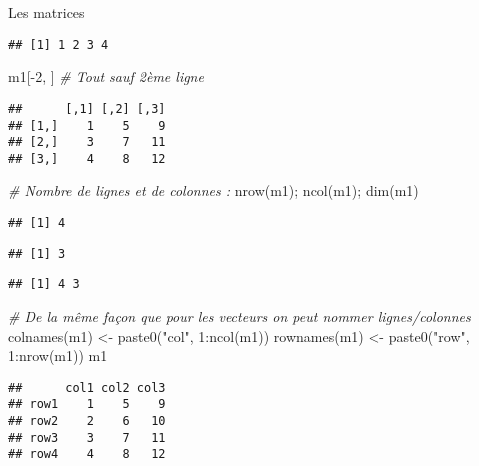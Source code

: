 \documentclass[10pt,xcolor=table,color={dvipsnames,usenames},ignorenonframetext,usepdftitle=false,french]{beamer}
\newenvironment{Shaded}{\begin{snugshade}}{\end{snugshade}}
\newcommand{\CommentTok}[1]{\textcolor[rgb]{0.56,0.35,0.01}{\textit{#1}}}
\newcommand{\DecValTok}[1]{\textcolor[rgb]{0.00,0.00,0.81}{#1}}
\newcommand{\FunctionTok}[1]{\textcolor[rgb]{0.00,0.00,0.00}{#1}}
\newcommand{\NormalTok}[1]{#1}
\newcommand{\OtherTok}[1]{\textcolor[rgb]{0.56,0.35,0.01}{#1}}
\newcommand{\SpecialCharTok}[1]{\textcolor[rgb]{0.00,0.00,0.00}{#1}}
\newcommand{\StringTok}[1]{\textcolor[rgb]{0.31,0.60,0.02}{#1}}
\begin{document}
\begin{frame}{Les matrices}
\begin{verbatim}
## [1] 1 2 3 4
\end{verbatim}

\begin{Shaded}
\begin{Highlighting}[]
\NormalTok{m1[}\SpecialCharTok{{-}}\DecValTok{2}\NormalTok{, ] }\CommentTok{\# Tout sauf 2ème ligne}
\end{Highlighting}
\end{Shaded}

\begin{verbatim}
##      [,1] [,2] [,3]
## [1,]    1    5    9
## [2,]    3    7   11
## [3,]    4    8   12
\end{verbatim}

\begin{Shaded}
\begin{Highlighting}[]
\CommentTok{\# Nombre de lignes et de colonnes :}
\FunctionTok{nrow}\NormalTok{(m1); }\FunctionTok{ncol}\NormalTok{(m1); }\FunctionTok{dim}\NormalTok{(m1)}
\end{Highlighting}
\end{Shaded}

\begin{verbatim}
## [1] 4
\end{verbatim}

\begin{verbatim}
## [1] 3
\end{verbatim}

\begin{verbatim}
## [1] 4 3
\end{verbatim}

\begin{Shaded}
\begin{Highlighting}[]
\CommentTok{\# De la même façon que pour les vecteurs on peut nommer lignes/colonnes}
\FunctionTok{colnames}\NormalTok{(m1) }\OtherTok{\textless{}{-}} \FunctionTok{paste0}\NormalTok{(}\StringTok{"col"}\NormalTok{, }\DecValTok{1}\SpecialCharTok{:}\FunctionTok{ncol}\NormalTok{(m1))}
\FunctionTok{rownames}\NormalTok{(m1) }\OtherTok{\textless{}{-}} \FunctionTok{paste0}\NormalTok{(}\StringTok{"row"}\NormalTok{, }\DecValTok{1}\SpecialCharTok{:}\FunctionTok{nrow}\NormalTok{(m1))}
\NormalTok{m1}
\end{Highlighting}
\end{Shaded}

\begin{verbatim}
##      col1 col2 col3
## row1    1    5    9
## row2    2    6   10
## row3    3    7   11
## row4    4    8   12
\end{verbatim}


\end{frame}
\end{document}
